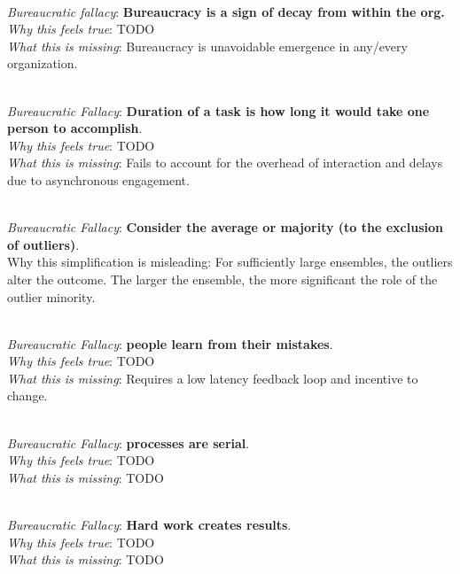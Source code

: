 \ \\

\textit{Bureaucratic fallacy}: \textbf{Bureaucracy is a sign of decay from within the org.} \\
\textit{Why this feels true}: TODO\\
\textit{What this is missing}: Bureaucracy is unavoidable emergence in any/every organization.

\ \\

\textit{Bureaucratic Fallacy}: \textbf{Duration of a task is how long it would take one person to accomplish}.  \\
\textit{Why this feels true}: TODO\\
\textit{What this is missing}: Fails to account for the overhead of interaction and delays due to asynchronous engagement.


\ \\

\textit{Bureaucratic Fallacy}: \textbf{Consider the average or majority (to the exclusion of outliers)}. \\
Why this simplification is misleading: For sufficiently large ensembles, the outliers alter the outcome. The larger the ensemble, the more significant the role of the outlier minority.

\ \\

\textit{Bureaucratic Fallacy}: \textbf{people learn from their mistakes}. \\
\textit{Why this feels true}: TODO\\
\textit{What this is missing}: Requires a low latency feedback loop and incentive to change.

\ \\

\textit{Bureaucratic Fallacy}: \textbf{processes are serial}.\\
\textit{Why this feels true}: TODO \\
\textit{What this is missing}: TODO


\ \\

\textit{Bureaucratic Fallacy}: \textbf{Hard work creates results}.\\
\textit{Why this feels true}: TODO\\
\textit{What this is missing}: TODO


\ \\

